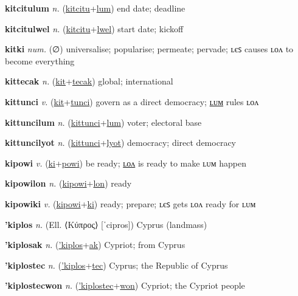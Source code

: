 \textbf{\hypertarget{kitcitulum}{kitcitulum}} \textit{n.} (\hyperlink{kitcitu}{kitcitu}+\allowbreak \hyperlink{lum}{lum})
end date; deadline

\textbf{\hypertarget{kitcitulwel}{kitcitulwel}} \textit{n.} (\hyperlink{kitcitu}{kitcitu}+\allowbreak \hyperlink{lwel}{lwel})
start date; kickoff

\textbf{\hypertarget{kitki}{kitki}} \textit{num.} (∅)
universalise; popularise; permeate; pervade; ʟєꜱ causes ʟᴏᴧ to become everything

\textbf{\hypertarget{kittecak}{kittecak}} \textit{n.} (\hyperlink{kit}{kit}+\allowbreak \hyperlink{tecak}{tecak})
global; international

\textbf{\hypertarget{kittunci}{kittunci}} \textit{v.} (\hyperlink{kit}{kit}+\allowbreak \hyperlink{tunci}{tunci})
govern as a direct democracy; \hyperlink{kittuncilum}{ʟᴜᴍ} rules ʟᴏᴧ

\textbf{\hypertarget{kittuncilum}{kittuncilum}} \textit{n.} (\hyperlink{kittunci}{kittunci}+\allowbreak \hyperlink{lum}{lum})
voter; electoral base

\textbf{\hypertarget{kittuncilyot}{kittuncilyot}} \textit{n.} (\hyperlink{kittunci}{kittunci}+\allowbreak \hyperlink{lyot}{lyot})
democracy; direct democracy

\textbf{\hypertarget{kipowi}{kipowi}} \textit{v.} (\hyperlink{ki}{ki}+\allowbreak \hyperlink{powi}{powi})
be ready; \hyperlink{kipowilon}{ʟᴏᴧ} is ready to make ʟᴜᴍ happen

\textbf{\hypertarget{kipowilon}{kipowilon}} \textit{n.} (\hyperlink{kipowi}{kipowi}+\allowbreak \hyperlink{lon}{lon})
ready

\textbf{\hypertarget{kipowiki}{kipowiki}} \textit{v.} (\hyperlink{kipowi}{kipowi}+\allowbreak \hyperlink{ki}{ki})
ready; prepare; ʟєꜱ gets ʟᴏᴧ ready for ʟᴜᴍ

\textbf{\hypertarget{'kiplos}{'kiplos}} \textit{n.} (Ell. ⟨Κύπρος⟩ [ˈcipros])
Cyprus (landmass)

\textbf{\hypertarget{'kiplosak}{'kiplosak}} \textit{n.} (\hyperlink{'kiplos}{'kiplos}+\allowbreak \hyperlink{ak}{ak})
Cypriot; from Cyprus

\textbf{\hypertarget{'kiplostec}{'kiplostec}} \textit{n.} (\hyperlink{'kiplos}{'kiplos}+\allowbreak \hyperlink{tec}{tec})
Cyprus; the Republic of Cyprus

\textbf{\hypertarget{'kiplostecwon}{'kiplostecwon}} \textit{n.} (\hyperlink{'kiplostec}{'kiplostec}+\allowbreak \hyperlink{won}{won})
Cypriot; the Cypriot people

